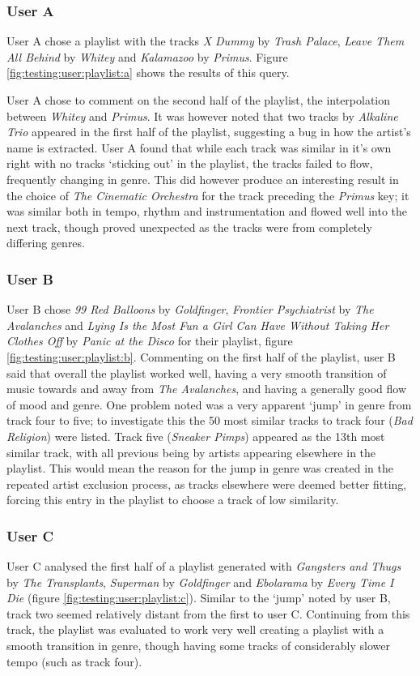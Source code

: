\subsubsection{User A}
User A chose a playlist with the tracks \emph{X Dummy} by \emph{Trash Palace}, \emph{Leave Them All Behind} by \emph{Whitey} and \emph{Kalamazoo} by \emph{Primus}. Figure \ref{fig:testing:user:playlist:a} shows the results of this query.

User A chose to comment on the second half of the playlist, the interpolation between \emph{Whitey} and \emph{Primus}. It was however noted that two tracks by \emph{Alkaline Trio} appeared in the first half of the playlist, suggesting a bug in how the artist's name is extracted. User A found that while each track was similar in it's own right with no tracks `sticking out' in the playlist, the tracks failed to flow, frequently changing in genre. This did however produce an interesting result in the choice of \emph{The Cinematic Orchestra} for the track preceding the \emph{Primus} key; it was similar both in tempo, rhythm and instrumentation and flowed well into the next track, though proved unexpected as the tracks were from completely differing genres.

\subsubsection{User B}
User B chose \emph{99 Red Balloons} by \emph{Goldfinger}, \emph{Frontier Psychiatrist} by \emph{The Avalanches} and \emph{Lying Is the Most Fun a Girl Can Have Without Taking Her Clothes Off} by \emph{Panic at the Disco} for their playlist, figure \ref{fig:testing:user:playlist:b}. Commenting on the first half of the playlist, user B said that overall the playlist worked well, having a very smooth transition of music towards and away from \emph{The Avalanches}, and having a generally good flow of mood and genre. One problem noted was a very apparent `jump' in genre from track four to five; to investigate this the 50 most similar tracks to track four (\emph{Bad Religion}) were listed. Track five (\emph{Sneaker Pimps}) appeared as the 13th most similar track, with all previous being by artists appearing elsewhere in the playlist. This would mean the reason for the jump in genre was created in the repeated artist exclusion process, as tracks elsewhere were deemed better fitting, forcing this entry in the playlist to choose a track of low similarity.

\subsubsection{User C}
User C analysed the first half of a playlist generated with \emph{Gangsters and Thugs} by \emph{The Transplants}, \emph{Superman} by \emph{Goldfinger} and \emph{Ebolarama} by \emph{Every Time I Die} (figure \ref{fig:testing:user:playlist:c}). Similar to the `jump' noted by user B, track two seemed relatively distant from the first to user C. Continuing from this track, the playlist was evaluated to work very well creating a playlist with a smooth transition in genre, though having some tracks of considerably slower tempo (such as track four).

